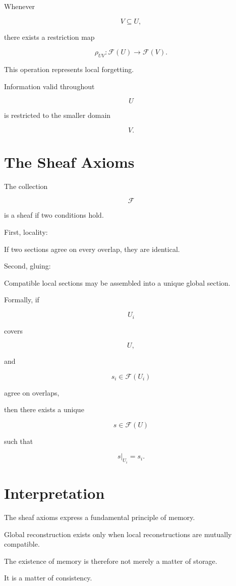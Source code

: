 \documentclass[12pt,oneside]{book}
\theoremstyle{plain} \newtheorem{theorem}{Theorem}[chapter] \newtheorem{lemma}[theorem]{Lemma} \newtheorem{proposition}[theorem]{Proposition} \newtheorem{corollary}[theorem]{Corollary}
\theoremstyle{definition} \newtheorem{definition}[theorem]{Definition} \newtheorem{axiom}[theorem]{Axiom} \newtheorem{construction}[theorem]{Construction}
\theoremstyle{remark} \newtheorem{remark}[theorem]{Remark} \newtheorem{example}[theorem]{Example}
\begin{document}
Whenever

\[
V
\subseteq
U,
\]

there exists a restriction map

\[
\rho_{UV}
:
\mathcal F(U)
\rightarrow
\mathcal F(V).
\]

This operation represents local forgetting.

Information valid throughout

\[
U
\]

is restricted to the smaller domain

\[
V.
\]

\section{The Sheaf Axioms}

The collection

\[
\mathcal F
\]

is a sheaf if two conditions hold.

First, locality:

If two sections agree on every overlap, they are identical.

Second, gluing:

Compatible local sections may be assembled into a unique global section.

Formally, if

\[
{U_i}
\]

covers

\[
U,
\]

and

\[
s_i
\in
\mathcal F(U_i)
\]

agree on overlaps,

then there exists a unique

\[
s
\in
\mathcal F(U)
\]

such that

\[
s|_{U_i}
=
s_i.
\]

\section{Interpretation}

The sheaf axioms express a fundamental principle of memory.

Global reconstruction exists only when local reconstructions are mutually compatible.

The existence of memory is therefore not merely a matter of storage.

It is a matter of consistency.
\end{document}
